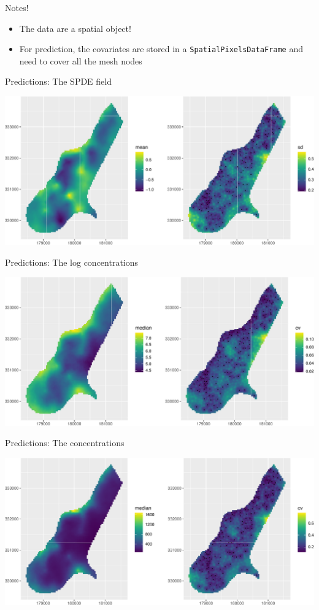 \documentclass[
  ignorenonframetext,
]{beamer}
\begin{document}
\begin{frame}[fragile]{Notes!}
\protect\hypertarget{notes}{}
\begin{itemize}
\item
  The data are a spatial object!
\item
  For prediction, the covariates are stored in a
  \texttt{SpatialPixelsDataFrame} and need to cover all the mesh nodes
\end{itemize}
\end{frame}

\begin{frame}{Predictions: The SPDE field}
\protect\hypertarget{predictions-the-spde-field}{}
\begin{center}\includegraphics[width=0.8\linewidth]{Part3_Spatial_files/figure-beamer/unnamed-chunk-19-1} \end{center}
\end{frame}

\begin{frame}{Predictions: The log concentrations}
\protect\hypertarget{predictions-the-log-concentrations}{}
\begin{center}\includegraphics[width=0.8\linewidth]{Part3_Spatial_files/figure-beamer/unnamed-chunk-20-1} \end{center}
\end{frame}

\begin{frame}{Predictions: The concentrations}
\protect\hypertarget{predictions-the-concentrations}{}
\begin{center}\includegraphics[width=0.8\linewidth]{Part3_Spatial_files/figure-beamer/unnamed-chunk-21-1} \end{center}
\end{frame}
\end{document}

